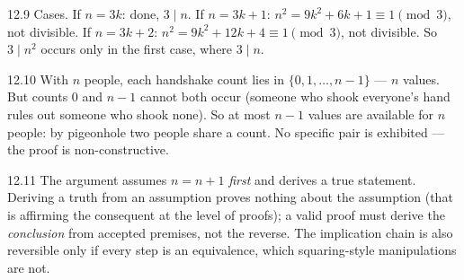 \begin{solution}{12.9}
Cases. If $n = 3k$: done, $3 \mid n$. If $n = 3k+1$:
$n^2 = 9k^2 + 6k + 1 \equiv 1 \pmod 3$, not divisible. If $n = 3k+2$:
$n^2 = 9k^2 + 12k + 4 \equiv 1 \pmod 3$, not divisible. So $3 \mid n^2$
occurs only in the first case, where $3 \mid n$.
\end{solution}

\begin{solution}{12.10}
With $n$ people, each handshake count lies in $\{0, 1, \ldots, n-1\}$ ---
$n$ values. But counts $0$ and $n-1$ cannot both occur (someone who shook
everyone's hand rules out someone who shook none). So at most $n - 1$
values are available for $n$ people: by pigeonhole two people share a
count. No specific pair is exhibited --- the proof is non-constructive.
\end{solution}

\begin{solution}{12.11}
The argument assumes $n = n + 1$ \emph{first} and derives a true statement.
Deriving a truth from an assumption proves nothing about the assumption
(that is affirming the consequent at the level of proofs); a valid proof
must derive the \emph{conclusion} from accepted premises, not the reverse.
The implication chain is also reversible only if every step is an
equivalence, which squaring-style manipulations are not.
\end{solution}
